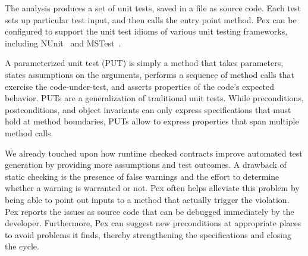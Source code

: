 \documentclass[10pt,twocolumn]{article}
\newcommand{\comment}[1]{}
\begin{document}
The analysis produces a set of unit tests,
saved in a file as source code.
Each test sets up particular test input, and then calls the entry point method.
Pex can be configured to support the unit test idioms of various unit testing frameworks,
including NUnit~\cite{nunit} and MSTest~\cite{mstest}.


A parameterized unit test (PUT) is
simply a method that takes parameters,
states assumptions on the arguments,
performs a sequence of method calls that exercise the code-under-test,
and asserts properties of the code's expected behavior.
PUTs are a generalization of traditional unit tests.
While preconditions, postconditions, and object invariants can only express
specifications that must hold at method boundaries,
PUTs allow to express properties that span multiple method calls.

We already touched upon how runtime checked contracts improve
automated test generation by providing more assumptions and test
outcomes. A drawback of static checking is the
presence of false warnings and the effort to determine whether a
warning is warranted or not. Pex often helps alleviate this problem by
being able to point out inputs to a method that actually trigger the
violation. Pex reports the issues as source code that can be debugged
immediately by the developer. Furthermore, Pex can suggest new preconditions at
appropriate places to avoid problems it finds, thereby strengthening
the specifications and closing the cycle.
\comment{
\Section{Tool Status}
Both Code Contracts and Pex are available for commercial use through 
DevLabs, a site used for early evaluation of potential technologies from
Microsoft.

Future work includes producing formatted documentation from the specifications.
}
\end{document}
